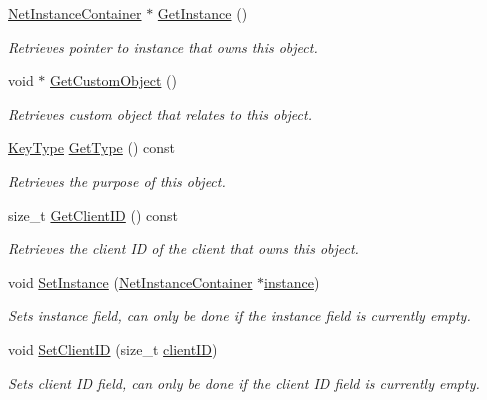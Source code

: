 \begin{DoxyCompactItemize}
\hyperlink{class_net_instance_container}{NetInstanceContainer} $\ast$ \hyperlink{class_net_completion_key_a70730f2d2670ef14f845de2f4612544e}{GetInstance} ()
\begin{DoxyCompactList}\small\item\em Retrieves pointer to instance that owns this object. \item\end{DoxyCompactList}\item 
void $\ast$ \hyperlink{class_net_completion_key_a6283778aff46c5eebecdf2490fdfb132}{GetCustomObject} ()
\begin{DoxyCompactList}\small\item\em Retrieves custom object that relates to this object. \item\end{DoxyCompactList}\item 
\hyperlink{class_net_completion_key_a129b5d89d5f2ac58abcc9872adc85d32}{KeyType} \hyperlink{class_net_completion_key_ae65499f1db35959126342129592deefb}{GetType} () const 
\begin{DoxyCompactList}\small\item\em Retrieves the purpose of this object. \item\end{DoxyCompactList}\item 
size\_\-t \hyperlink{class_net_completion_key_af04e377598b8026ba09f7a02a61792ec}{GetClientID} () const 
\begin{DoxyCompactList}\small\item\em Retrieves the client ID of the client that owns this object. \item\end{DoxyCompactList}\item 
void \hyperlink{class_net_completion_key_a241120bcb7868051a3abb2ebb5731f53}{SetInstance} (\hyperlink{class_net_instance_container}{NetInstanceContainer} $\ast$\hyperlink{class_net_completion_key_a8f408ea2a3985e19cf3381fcbcae3318}{instance})
\begin{DoxyCompactList}\small\item\em Sets instance field, can only be done if the instance field is currently empty. \item\end{DoxyCompactList}\item 
void \hyperlink{class_net_completion_key_a78ca3d78d562a0ae023e50fef38a194d}{SetClientID} (size\_\-t \hyperlink{class_net_completion_key_a36d25bfffcd6bb9adad4c243cd4430e0}{clientID})
\begin{DoxyCompactList}\small\item\em Sets client ID field, can only be done if the client ID field is currently empty. \item\end{DoxyCompactList}\item 

\end{DoxyCompactItemize}
